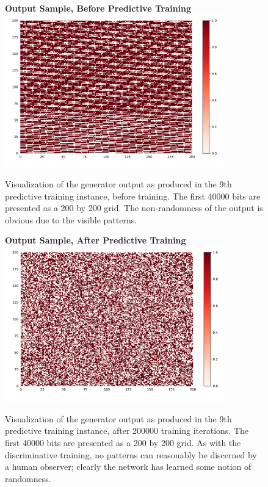 \documentclass[12pt, titlepage]{report}
\theoremstyle{definition}
\begin{document}
{    \begin{figure}
    \centering
    \textbf{Output Sample, Before Predictive Training}
    \includegraphics[width=0.85\textwidth]{img/predictive_before}\\
    \caption{Visualization of the generator output as produced in the 9th predictive training instance, before training. The first 40000 bits are presented as a 200 by 200 grid. The non-randomness of the output is obvious due to the visible patterns.}
    \label{figure:visualize_predictive_before}
    \end{figure}
    
    \begin{figure}
    \centering
    \textbf{Output Sample, After Predictive Training}
    \includegraphics[width=0.85\textwidth]{img/predictive_after}\\
    \caption{Visualization of the generator output as produced in the 9th predictive training instance, after 200000 training iterations. The first 40000 bits are presented as a 200 by 200 grid. As with the discriminative training, no patterns can reasonably be discerned by a human observer; clearly the network has learned some notion of randomness.}
    \label{figure:visualize_predictive_after}
    \end{figure}



}
\end{document}
